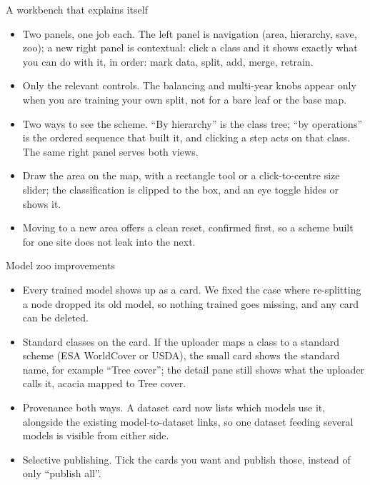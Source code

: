 \documentclass[aspectratio=169]{beamer}
\begin{document}
\begin{frame}{A workbench that explains itself}
\begin{itemize}
  \item Two panels, one job each. The left panel is navigation (area, hierarchy, save, zoo); a new
  right panel is contextual: click a class and it shows exactly what you can do with it, in order:
  mark data, split, add, merge, retrain.
  \item Only the relevant controls. The balancing and multi-year knobs appear only when you are
  training your own split, not for a bare leaf or the base map.
  \item Two ways to see the scheme. ``By hierarchy'' is the class tree; ``by operations'' is the
  ordered sequence that built it, and clicking a step acts on that class. The same right panel serves
  both views.
  \item Draw the area on the map, with a rectangle tool or a click-to-centre size slider; the
  classification is clipped to the box, and an eye toggle hides or shows it.
  \item Moving to a new area offers a clean reset, confirmed first, so a scheme built for one site does
  not leak into the next.
\end{itemize}
\end{frame}

\begin{frame}{Model zoo improvements}
\begin{itemize}
  \item Every trained model shows up as a card. We fixed the case where re-splitting a node dropped
  its old model, so nothing trained goes missing, and any card can be deleted.
  \item Standard classes on the card. If the uploader maps a class to a standard scheme (ESA
  WorldCover or USDA), the small card shows the standard name, for example ``Tree cover''; the detail
  pane still shows what the uploader calls it, acacia mapped to Tree cover.
  \item Provenance both ways. A dataset card now lists which models use it, alongside the existing
  model-to-dataset links, so one dataset feeding several models is visible from either side.
  \item Selective publishing. Tick the cards you want and publish those, instead of only ``publish
  all''.
\end{itemize}
\end{frame}
\end{document}
